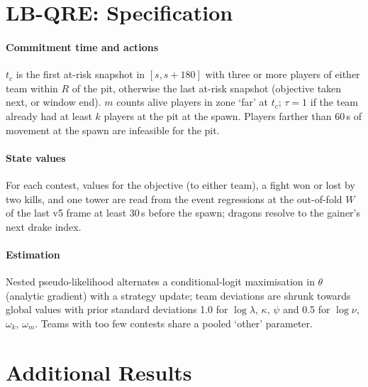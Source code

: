 \section{LB-QRE: Specification}
\label{app:qre}

\paragraph*{Commitment time and actions} $t_c$ is the first at-risk snapshot in $[s,s{+}180]$ with three or more players of either team within $R$ of the pit, otherwise the last at-risk snapshot (objective taken next, or window end). $m$ counts alive players in zone `far' at $t_c$; $\tau=1$ if the team already had at least $k$ players at the pit at the spawn. Players farther than 60\,s of movement at the spawn are infeasible for the pit.
\paragraph*{State values} For each contest, values for the objective (to either team), a fight won or lost by two kills, and one tower are read from the event regressions at the out-of-fold $W$ of the last v5 frame at least 30\,s before the spawn; dragons resolve to the gainer's next drake index.
\paragraph*{Estimation} Nested pseudo-likelihood alternates a conditional-logit maximisation in $\theta$ (analytic gradient) with a strategy update; team deviations are shrunk towards global values with prior standard deviations 1.0 for $\log\lambda$, $\kappa$, $\psi$ and 0.5 for $\log\nu$, $\omega_k$, $\omega_m$.
Teams with too few contests share a pooled `other' parameter.

\section{Additional Results}
\label{app:results}


